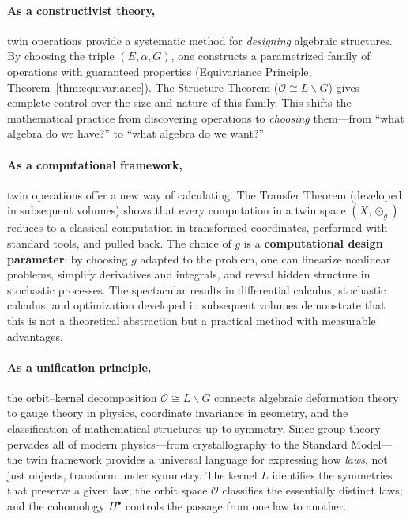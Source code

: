 \documentclass[11pt,a4paper,openany]{book}
\theoremstyle{plain}
\theoremstyle{definition}
\newcommand{\twing}[1]{\odot_{#1}}
\newcommand{\opspace}{\mathcal{O}}
\newcommand{\lingroup}{L}
\newcommand{\actspace}{E}
\newcommand{\groupG}{G}
\begin{document}
\paragraph{As a constructivist theory,} twin operations provide a systematic method for \emph{designing} algebraic structures. By choosing the triple $(\actspace, \alpha, \groupG)$, one constructs a parametrized family of operations with guaranteed properties (Equivariance Principle, Theorem~\ref{thm:equivariance}). The Structure Theorem ($\opspace \cong \lingroup\backslash\groupG$) gives complete control over the size and nature of this family. This shifts the mathematical practice from discovering operations to \emph{choosing} them---from ``what algebra do we have?'' to ``what algebra do we want?''

\paragraph{As a computational framework,} twin operations offer a new way of calculating. The Transfer Theorem (developed in subsequent volumes) shows that every computation in a twin space $(X, \twing{g})$ reduces to a classical computation in transformed coordinates, performed with standard tools, and pulled back. The choice of $g$ is a \textbf{computational design parameter}: by choosing $g$ adapted to the problem, one can linearize nonlinear problems, simplify derivatives and integrals, and reveal hidden structure in stochastic processes. The spectacular results in differential calculus, stochastic calculus, and optimization developed in subsequent volumes demonstrate that this is not a theoretical abstraction but a practical method with measurable advantages.

\paragraph{As a unification principle,} the orbit--kernel decomposition $\opspace \cong \lingroup\backslash\groupG$ connects algebraic deformation theory to gauge theory in physics, coordinate invariance in geometry, and the classification of mathematical structures up to symmetry. Since group theory pervades all of modern physics---from crystallography to the Standard Model---the twin framework provides a universal language for expressing how \emph{laws}, not just objects, transform under symmetry. The kernel $\lingroup$ identifies the symmetries that preserve a given law; the orbit space $\opspace$ classifies the essentially distinct laws; and the cohomology $H^\bullet$ controls the passage from one law to another.
\end{document}
